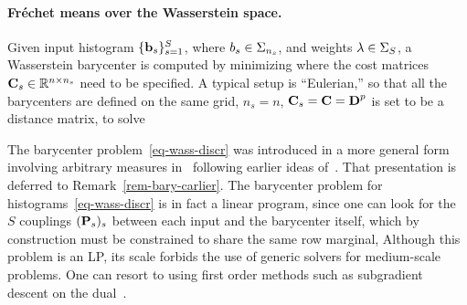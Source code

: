 \paragraph{Fr\'echet means over the Wasserstein space.}

Given input histogram $\{\b_s\}_{s=1}^S$, where $b_s \in \simplex_{n_s}$, and weights $\la \in \simplex_S$, a Wasserstein barycenter is computed by minimizing
where the cost matrices $\C_s \in \RR^{n \times n_s}$ need to be specified. 
%
A typical setup is ``Eulerian,'' so that all the barycenters are defined on the same grid, $n_s=n$, $\C_s=\C=\distD^p$ is set to be a distance matrix, to solve

The barycenter problem~\eqref{eq-wass-discr} was introduced in a more general form involving arbitrary measures in~\citet{Carlier_wasserstein_barycenter} following earlier ideas of~\citet{carlierekelandmatching}. That presentation is deferred to Remark~\ref{rem-bary-carlier}. %
The barycenter problem for histograms~\eqref{eq-wass-discr} is in fact a linear program, since one can look for the $S$ couplings $(\P_s)_s$ between each input and the barycenter itself, which by construction must be constrained to share the same row marginal,
Although this problem is an LP, its scale forbids the use of generic solvers for medium-scale problems. One can resort to using first order methods such as subgradient descent on the dual~\citep{Carlier-NumericsBarycenters}.

